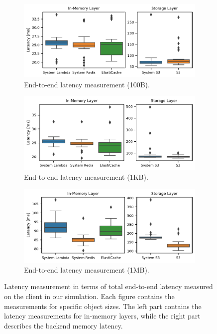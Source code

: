 \begin{figure}[pht!]
    \centering
    \begin{subfigure}{.85\textwidth}
        \includegraphics[width=\linewidth]{figures/client_latency_100B.pdf}
        \caption{End-to-end latency measurement (100B).}
        \label{fig:client_latency_100B}
    \end{subfigure}
    
    \begin{subfigure}{.85\textwidth}
        \includegraphics[width=\linewidth]{figures/client_latency_1KB.pdf}
        \caption{End-to-end latency measurement (1KB).}
        \label{fig:client_latency_1KB}
    \end{subfigure}

    \begin{subfigure}{.85\textwidth}
        \includegraphics[width=\linewidth]{figures/client_latency_1MB.pdf}
        \caption{End-to-end latency measurement (1MB).}
        \label{fig:client_latency_1MB}
    \end{subfigure}

    \caption{Latency measurement in terms of total end-to-end latency measured on the client in our simulation. Each figure contains the measurements for specific object sizes. The left part contains the latency measurements for in-memory layers, while the right part describes the backend memory latency.}
    \label{fig:latency}
\end{figure}

